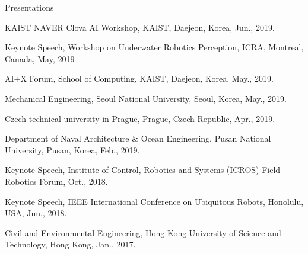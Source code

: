 \begin{rSection}{Presentations}

\begin{pubSubsectionNum}{}
  \item KAIST NAVER Clova AI Workshop, KAIST, Daejeon, Korea, Jun., 2019.

  \item Keynote Speech, Workshop on Underwater Robotics Perception, ICRA, Montreal, Canada, May, 2019

  \item AI+X Forum, School of Computing, KAIST, Daejeon, Korea, May., 2019.


  \item Mechanical Engineering, Seoul National University, Seoul, Korea, May., 2019.

  \item Czech technical university in Prague, Prague, Czech Republic, Apr., 2019.

  \item Department of Naval Architecture \& Ocean Engineering, Pusan National University, Pusan, Korea, Feb., 2019.


  \item Keynote Speech, Institute of Control, Robotics and Systems (ICROS) Field Robotics Forum, Oct., 2018.

  \item Keynote Speech, IEEE International Conference on Ubiquitous Robots, Honolulu, USA, Jun., 2018.


  \item Civil and Environmental Engineering, Hong Kong University of Science and Technology, Hong Kong, Jan., 2017.




\end{pubSubsectionNum}
\end{rSection}
